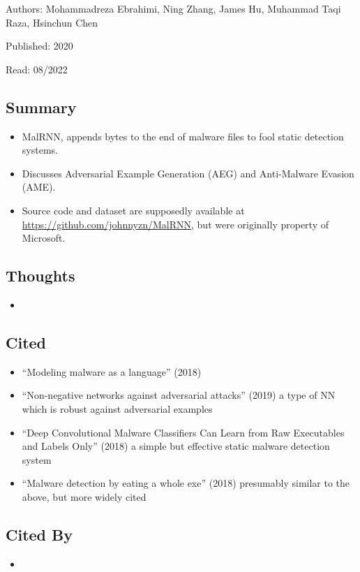 \documentclass{article}
\begin{document}
\noindent Authors: Mohammadreza Ebrahimi, Ning Zhang, James Hu, Muhammad Taqi Raza, Hsinchun Chen

\noindent Published: 2020

\noindent Read: 08/2022

\subsection*{Summary}
\begin{itemize}
\item MalRNN, appends bytes to the end of malware files to fool static detection systems.
\item Discusses Adversarial Example Generation (AEG) and Anti-Malware Evasion (AME).
\item Source code and dataset are supposedly available at \url{https://github.com/johnnyzn/MalRNN}, but were originally property of Microsoft.
\end{itemize}

\subsection*{Thoughts}
\begin{itemize}
\item
\end{itemize}

\subsection*{Cited}
\begin{itemize}
\item ``Modeling malware as a language'' (2018)
\item ``Non-negative networks against adversarial attacks'' (2019) a type of NN which is robust against adversarial examples
\item ``Deep Convolutional Malware Classifiers Can Learn from Raw Executables and Labels Only'' (2018) a simple but effective static malware detection system
\item ``Malware detection by eating a whole exe'' (2018) presumably similar to the above, but more widely cited
\end{itemize}

\subsection*{Cited By}
\begin{itemize}
\item
\end{itemize}
\end{document}
